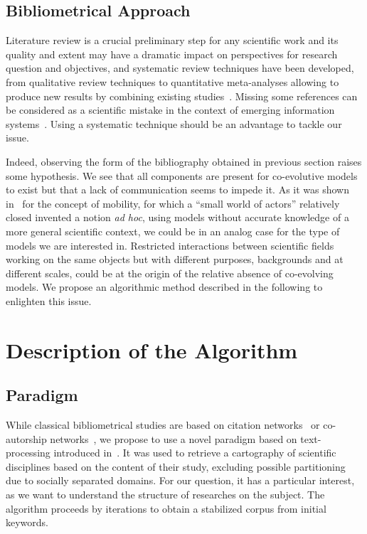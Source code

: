 \subsection{Bibliometrical Approach}

Literature review is a crucial preliminary step for any scientific work and its quality and extent may have a dramatic impact on perspectives for research question and objectives, and systematic review techniques have been developed, from qualitative review techniques to quantitative meta-analyses allowing to produce new results by combining existing studies~\cite{rucker2012network}. Missing some references can be considered as a scientific mistake in the context of emerging information systems~\cite{lissacksubliminal}. Using a systematic technique should be an advantage to tackle our issue.

Indeed, observing the form of the bibliography obtained in previous section raises some hypothesis. We see that all components are present for co-evolutive models to exist but that a lack of communication seems to impede it. As it was shown in~\cite{commenges:tel-00923682} for the concept of mobility, for which a ``small world of actors'' relatively closed invented a notion \emph{ad hoc}, using models without accurate knowledge of a more general scientific context, we could be in an analog case for the type of models we are interested in. Restricted interactions between scientific fields working on the same objects but with different purposes, backgrounds and at different scales, could be at the origin of the relative absence of co-evolving models. We propose an algorithmic method described in the following to enlighten this issue.


\section{Description of the Algorithm}

\subsection{Paradigm}

While classical bibliometrical studies are based on citation networks~\cite{2013arXiv1310.8220N} or co-autorship networks~\cite{2014arXiv1402.7268S}, we propose to use a novel paradigm based on text-processing introduced in~\cite{chavalarias2013phylomemetic}. It was used to retrieve a cartography of scientific disciplines based on the content of their study, excluding possible partitioning due to socially separated domains. For our question, it has a particular interest, as we want to understand the structure of researches on the subject. The algorithm proceeds by iterations to obtain a stabilized corpus from initial keywords.

